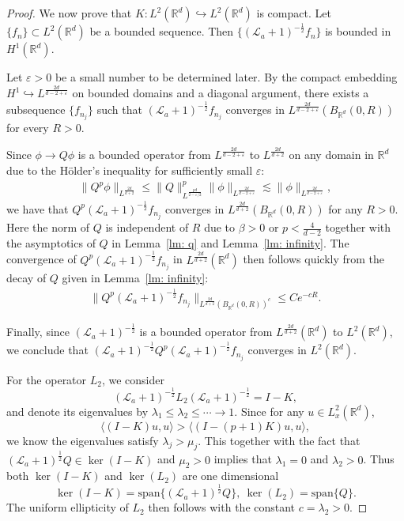 \documentclass[12pt]{amsart}
\newcommand{\R}{\mathbb R}
\newcommand{\eps}{\varepsilon}
\newcommand{\la}{\mathcal L_a}
\begin{document}
\begin{proof}
We now prove that $K: L^2(\R^d)\hookrightarrow L^2(\R^d)$ is compact.  
Let $\{f_n\} \subset L^2(\R^d)$ be a bounded sequence. Then  
$\{(\la+1)^{-\frac12} f_n\}$ is bounded in $H^1(\R^d)$.  

Let $\varepsilon > 0$ be a small number to be determined later. By the compact embedding 
$H^1 \hookrightarrow L^{\frac{2d}{d-2+\varepsilon}}$ on bounded domains and a diagonal argument, 
there exists a subsequence $\{f_{n_j}\}$ such that 
$(\la+1)^{-\frac12} f_{n_j}$ converges in 
$L^{\frac{2d}{d-2+\varepsilon}}(B_{\R^d}(0,R))$ for every $R > 0$.  

Since $\phi \to Q\phi$ is a bounded operator from $L^{\frac{2d}{d-2+\varepsilon}}$ to $L^{\frac{2d}{d+2}}$ on any domain in $\R^d$ due to the H\"older’s inequality for sufficiently small $\eps$:
\begin{align*}
\|Q^p \phi \|_{L^{\frac{2d}{d+2}}}
\le \|Q\|_{L^{\frac{pd}{2-\varepsilon/2}}}^p 
   \|\phi\|_{L^{\frac{2d}{d-2+\varepsilon}}} 
\lesssim \|\phi\|_{L^{\frac{2d}{d-2+\varepsilon}}},
\end{align*}
we have that $Q^p (\la+1)^{-\frac12} f_{n_j}$ converges in 
$L^{\frac{2d}{d+2}}(B_{\R^d}(0,R))$ for any $R > 0$.  
Here the norm of $Q$ is independent of $R$ due to $\beta > 0$ or
$p < \tfrac{4}{d-2}$ together with the asymptotics of $Q$ in Lemma~\ref{lm: q} and Lemma~\ref{lm: infinity}. The convergence of 
$Q^p (\la+1)^{-\frac12} f_{n_j}$ in 
$L^{\frac{2d}{d+2}}(\R^d)$ then follows quickly from the decay of $Q$ given in Lemma~\ref{lm: infinity}:
\begin{align*}
\|Q^p (\la+1)^{-\frac12} f_{n_j}\|_{L^{\frac{2d}{d+2}}(B_{\R^d}(0,R))^c}
   \le C e^{-cR}. 
\end{align*}

Finally, since $(\la+1)^{-\frac12}$ is a bounded operator from 
$L^{\frac{2d}{d+2}}(\R^d)$ to $L^2(\R^d)$, we conclude that 
$(\la+1)^{-\frac12} Q^p (\la+1)^{-\frac12} f_{n_j}$ converges in 
$L^2(\R^d)$.  



For the operator $L_2$, we consider 
 \[(\la+1)^{-\frac 12}L_2(\la+1)^{-\frac 12}=I-K,\]
and denote its eigenvalues by $\lambda_1\le \lambda_2\le \cdots \to 1$. Since for any $u\in L^2_x(\R^d)$, 
\[\langle (I-K)u, u\rangle >\langle (I-(p+1)K)u, u\rangle,\]
we know the eigenvalues satisfy $\lambda_j>\mu_j$. This together with the fact that $(\la+1)^{\frac 12}Q\in \ker(I-K)$ and $\mu_2>0$ implies that $\lambda_1=0$ and $\lambda_2>0$. Thus both $\ker(I-K)$ and $\ker (L_2)$ are one dimensional 
\[
\ker(I-K) = \text{span}\{(\la+1)^{\tfrac{1}{2}}Q\}, \ \ker(L_2) = \text{span}\{Q\}.
\]
The uniform ellipticity of $L_2$ then follows with the constant $c=\lambda_2>0$. 



\end{proof}
\end{document}
